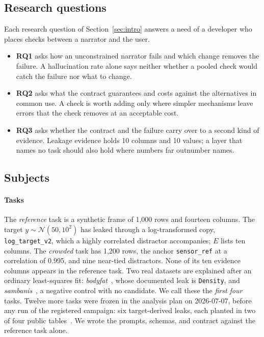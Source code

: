 \documentclass[journal]{IEEEtran}
\begin{document}
\subsection{Research questions}

Each research question of Section~\ref{sec:intro} answers a need of a developer
who places checks between a narrator and the user.
\begin{itemize}
\item \textbf{RQ1} asks how an unconstrained narrator fails and which change
removes the failure. A hallucination rate alone says neither whether a pooled
check would catch the failure nor what to change.
\item \textbf{RQ2} asks what the contract guarantees and costs against the
alternatives in common use. A check is worth adding only where simpler mechanisms
leave errors that the check removes at an acceptable cost.
\item \textbf{RQ3} asks whether the contract and the failure carry over to a
second kind of evidence. Leakage evidence holds 10 columns and 10 values; a layer
that names no task should also hold where numbers far outnumber names.
\end{itemize}

\subsection{Subjects}\label{sec:subjects}

\paragraph{Tasks}
The \emph{reference} task is a synthetic frame of 1,000 rows and fourteen
columns. The target $y\sim\mathcal{N}(50,10^2)$ has leaked through a
log-transformed copy, \texttt{log\_target\_v2}, which a highly correlated
distractor accompanies; $E$ lists ten columns. The \emph{crowded} task has 1,200
rows, the anchor \texttt{sensor\_ref} at a correlation of 0.995, and nine
near-tied distractors. None of its ten evidence columns appears in the reference
task. Two real datasets are explained after an ordinary least-squares fit:
\emph{bodyfat}~\cite{penrose1985bodyfat}, whose documented leak is
\texttt{Density}, and \emph{sambanis}~\cite{muchlinski2016civilwar}, a negative
control with no candidate. We call these the \emph{first four} tasks. Twelve more
tasks were frozen in the analysis plan on 2026-07-07, before any run of the
registered campaign: six target-derived leaks, each planted in two of four public
tables~\cite{lantz2013mlr,janosi1988heart,ibm2019telco,decock2011ames}. We wrote
the prompts, schemas, and contract against the reference task alone.
\end{document}

